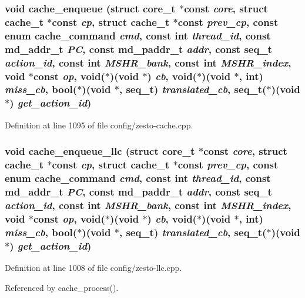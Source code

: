 \subsubsection[{cache\_\-enqueue}]{\setlength{\rightskip}{0pt plus 5cm}void cache\_\-enqueue (struct {\bf core\_\-t} $\ast$const  {\em core}, \/  struct {\bf cache\_\-t} $\ast$const  {\em cp}, \/  struct {\bf cache\_\-t} $\ast$const  {\em prev\_\-cp}, \/  const enum {\bf cache\_\-command} {\em cmd}, \/  const int {\em thread\_\-id}, \/  const {\bf md\_\-addr\_\-t} {\em PC}, \/  const {\bf md\_\-paddr\_\-t} {\em addr}, \/  const {\bf seq\_\-t} {\em action\_\-id}, \/  const int {\em MSHR\_\-bank}, \/  const int {\em MSHR\_\-index}, \/  void $\ast$const  {\em op}, \/  void($\ast$)(void $\ast$) {\em cb}, \/  void($\ast$)(void $\ast$, int) {\em miss\_\-cb}, \/  bool($\ast$)(void $\ast$, {\bf seq\_\-t}) {\em translated\_\-cb}, \/  {\bf seq\_\-t}($\ast$)(void $\ast$) {\em get\_\-action\_\-id})}\label{config_2zesto-cache_8h_0831369c0f015a2e350b71f2fc445c70}




Definition at line 1095 of file config/zesto-cache.cpp.
\subsubsection[{cache\_\-enqueue\_\-llc}]{\setlength{\rightskip}{0pt plus 5cm}void cache\_\-enqueue\_\-llc (struct {\bf core\_\-t} $\ast$const  {\em core}, \/  struct {\bf cache\_\-t} $\ast$const  {\em cp}, \/  struct {\bf cache\_\-t} $\ast$const  {\em prev\_\-cp}, \/  const enum {\bf cache\_\-command} {\em cmd}, \/  const int {\em thread\_\-id}, \/  const {\bf md\_\-addr\_\-t} {\em PC}, \/  const {\bf md\_\-paddr\_\-t} {\em addr}, \/  const {\bf seq\_\-t} {\em action\_\-id}, \/  const int {\em MSHR\_\-bank}, \/  const int {\em MSHR\_\-index}, \/  void $\ast$const  {\em op}, \/  void($\ast$)(void $\ast$) {\em cb}, \/  void($\ast$)(void $\ast$, int) {\em miss\_\-cb}, \/  bool($\ast$)(void $\ast$, {\bf seq\_\-t}) {\em translated\_\-cb}, \/  {\bf seq\_\-t}($\ast$)(void $\ast$) {\em get\_\-action\_\-id})}\label{config_2zesto-cache_8h_6955e78ccb0fb1511754e8cd113e1dcc}




Definition at line 1008 of file config/zesto-llc.cpp.

Referenced by cache\_\-process().

